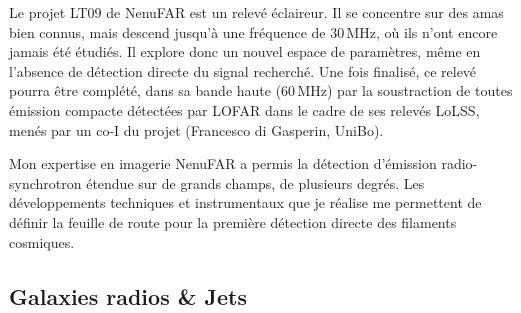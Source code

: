 \pg
Le projet LT09 de NenuFAR est un relev\'e \'eclaireur. Il se concentre sur des amas bien connus, mais descend jusqu'\`a une fr\'equence de 30\,MHz, o\`u ils n'ont encore jamais \'et\'e \'etudi\'es. Il explore donc un nouvel espace de param\`etres, m\^eme en l'absence de d\'etection directe du signal recherch\'e. Une fois finalis\'e, ce relev\'e pourra \^etre compl\'et\'e, dans sa bande haute (60\,MHz) par la soustraction de toutes \'emission compacte d\'etect\'ees par LOFAR dans le cadre de ses relev\'es LoLSS, men\'es par un co-I du projet (Francesco di Gasperin, UniBo).%

\begin{tcolorbox}[colback=green!10, colframe=green!50!black, arc=3mm, boxrule=1pt]
	Mon expertise en imagerie NenuFAR a permis la d\'etection d'\'emission radio-synchrotron \'etendue sur de grands champs, de plusieurs degr\'es. Les développements techniques et instrumentaux que je réalise me permettent de définir la feuille de route pour la première détection directe des filaments cosmiques.
\end{tcolorbox}





\subsection*{Galaxies radios \& Jets}

